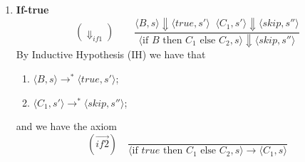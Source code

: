 \begin{solution}
\begin{enumerate}[label=(\alph*)]
\begin{enumerate}[label=(\alph{enumi}).\arabic*]
\item \textbf{If-true}
 \[ (\Downarrow_{if1}) \quad  \quad \frac{\langle B,s\rangle \Downarrow\langle true, s' \rangle \; \; \langle C_1, s' \rangle \Downarrow\langle skip, s''\rangle}{\langle \text{if }B \text{ then }C_1 \text{ else }C_2, s\rangle \Downarrow\langle skip, s''\rangle}\]
By Inductive Hypothesis (IH) we have that 
 \begin{enumerate}[label=(\roman*)]
     \item $\langle B,s\rangle \to^*\langle true, s' \rangle$;
     \item $\langle C_1, s' \rangle \to^*\langle skip, s''\rangle$;
 \end{enumerate}
 and we have the axiom
     \[ (\overset{\rightarrow}{if2}) \quad \frac{}{\langle \text{if }true \text{ then }C_1 \text{ else }C_2, s\rangle \to \langle C_1,s\rangle}\]


\end{enumerate}
\end{enumerate}
\end{solution}
